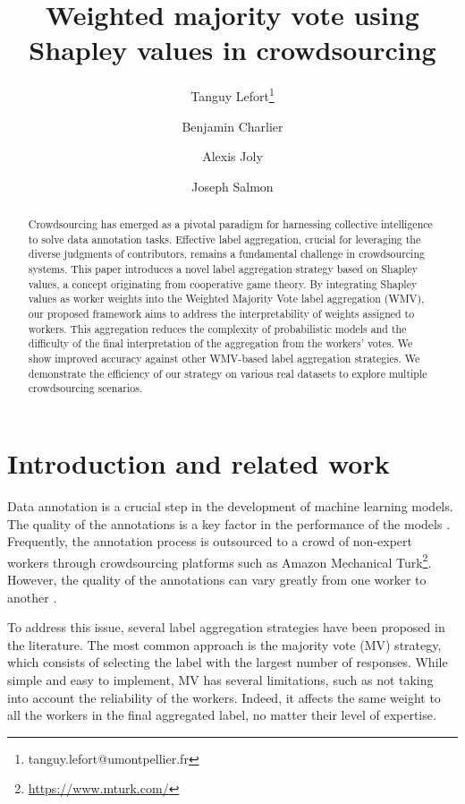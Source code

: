 \documentclass{cap2024}
\title{Weighted majority vote using Shapley values in crowdsourcing}
\author[1]{Tanguy Lefort\thanks{tanguy.lefort@umontpellier.fr}}
\author[2]{Benjamin Charlier}
\author[3]{Alexis Joly}
\author[4]{Joseph Salmon}
\affil[1]{University of Montpellier, IMAG, CNRS, LIRMM, Inria}
\affil[2]{University of Montpellier, IMAG, CNRS}
\affil[3]{LIRMM, Inria}
\affil[4]{University of Montpellier, IMAG, CNRS, Institut Universitaire de France (IUF)}
\begin{document}
\maketitle

\begin{abstract}
  Crowdsourcing has emerged as a pivotal paradigm for harnessing collective intelligence to solve data annotation tasks. Effective label aggregation, crucial for leveraging the diverse judgments of contributors, remains a fundamental challenge in crowdsourcing systems. This paper introduces a novel label aggregation strategy based on Shapley values, a concept originating from cooperative game theory. By integrating Shapley values as worker weights into the Weighted Majority Vote label aggregation (WMV), our proposed framework aims to address the interpretability of weights assigned to workers. This aggregation reduces the complexity of probabilistic models and the difficulty of the final interpretation of the aggregation from the workers' votes. We show improved accuracy against other WMV-based label aggregation strategies. We demonstrate the efficiency of our strategy on various real datasets to explore multiple crowdsourcing scenarios.
\medskip

\end{abstract}


\section{Introduction and related work}
\label{sec:intro}

Data annotation is a crucial step in the development of machine learning models. The quality of the annotations is a key factor in the performance of the models \citep{snow_cheap_2008}.
Frequently, the annotation process is outsourced to a crowd of non-expert workers through crowdsourcing platforms such as Amazon Mechanical Turk\footnote{\url{https://www.mturk.com/}}.
However, the quality of the annotations can vary greatly from one worker to another \citep{ross2009turkers,ipeirotis2010quality,hara2018data}.

To address this issue, several label aggregation strategies have been proposed in the literature.
The most common approach is the majority vote (MV) strategy, which consists of selecting the label with the largest number of responses.
While simple and easy to implement, MV has several limitations, such as not taking into account the reliability of the workers. Indeed, it affects the same weight to all the workers in the final aggregated label, no matter their level of expertise.
\end{document}
